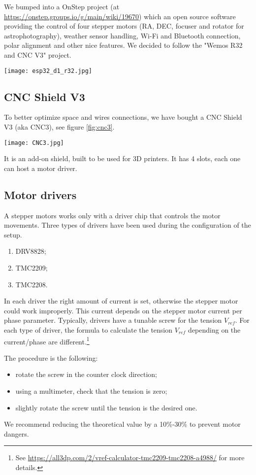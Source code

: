 We bumped into a OnStep project (at \url{https://onstep.groups.io/g/main/wiki/19670}) which an open source software providing the control of four stepper motors (RA, DEC, focuser and rotator for astrophotography), weather sensor handling, Wi-Fi and Bluetooth connection, polar alignment and other nice features.
We decided to follow the "Wemos R32 and CNC V3" project.

\begin{minipage}
    {.4\textwidth}
    \texttt{[image: esp32\_d1\_r32.jpg]}
    \label{fig:esp32}
\end{minipage}

\subsection{CNC Shield V3}
To better optimize space and wires connections, we have bought a CNC Shield V3 (aka CNC3), see figure \ref{fig:cnc3}.
\begin{minipage}
    {0.5\textwidth}
    \centering
    \texttt{[image: CNC3.jpg]}
    \label{fig:cnc3}
\end{minipage}
It is an add-on shield, built to be used for 3D printers.
It has 4 slots, each one can host a motor driver.

\subsection{Motor drivers}
A stepper motors works only with a driver chip that controls the motor movements.
Three types of drivers have been used during the configuration of the setup.
\begin{enumerate}
    \item DRV8828;
    \item TMC2209;
    \item TMC2208.
\end{enumerate}

In each driver the right amount of current is set, otherwise the stepper motor could work improperly.
This current depends on the stepper motor current per phase parameter.
Typically, drivers have a tunable screw for the tension \(V_{ref}\).
For each type of driver, the formula to calculate the tension \(V_{ref}\) depending on the current/phase are different.\footnote{See \url{https://all3dp.com/2/vref-calculator-tmc2209-tmc2208-a4988/} for more details.}

The procedure is the following:
\begin{itemize}
    \item rotate the screw in the counter clock direction;
    \item using a multimeter, check that the tension is zero;
    \item slightly rotate the screw until the tension is the desired one.
\end{itemize}
We recommend reducing the theoretical value by a 10\%-30\% to prevent motor dangers.

